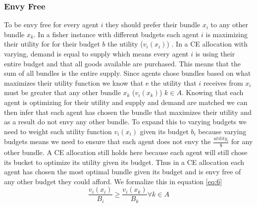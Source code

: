 \documentclass{article}
\begin{document}
\subsubsection{Envy Free}
To be envy free for every agent $i$ they should prefer their bundle $x_i$ to any other bundle $x_k$.  In a fisher instance with different budgets each agent $i$ is maximizing their utility for for their budget $b$ the utility ($v_i(x_i)$) . In a CE allocation with varying, demand is equal to supply which means every agent $i$ is using their entire budget and that all goods available are purchased. This means that the sum of all bundles is the entire supply. Since agents chose bundles based on what maximizes their utility function we know that e the utility that $i$ receives from $x_i$ must be greater that any other bundle $x_k$ ($v_i(x_k)$) $k \in A$. Knowing that each agent is optimizing for their utility and supply and demand are matched we can then infer that each agent has chosen the bundle that maximizes their utility and as a result do not envy any other bundle. To expand this to varying budgets we need to weight each utility function $v_i(x_i)$ given its budget $b_i$ because varying budgets means we need to ensure that each agent does not envy the $\frac{utility_i}{\$}$ for any other bundle. A CE allocation still holds here because each agent will still chose its bucket to optimize its utility given its budget. Thus in a CE allocation each agent has chosen the most optimal bundle given its budget and is envy free of any other budget they could afford. We formalize this in equation \ref{eq:6}
\begin{equation}
\label{eq:6}
\frac{v_i(x_i)}{B_i} \ge \frac{v_i(x_k)}{B_k} \forall k \in A
\end{equation}
\end{document}
